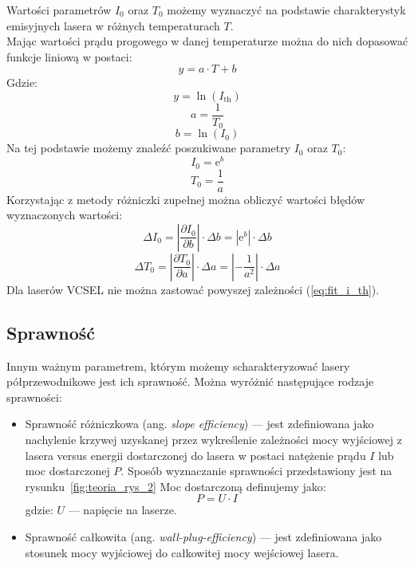 Wartości parametrów $I_0$ oraz $T_0$ możemy wyznaczyć na podstawie charakterystyk
emisyjnych lasera w różnych temperaturach $T$. \\
Mając wartości prądu progowego w danej temperaturze  można do nich dopasować funkcje liniową w postaci:
\begin{equation}
y = a \cdot T + b
\end{equation}
Gdzie:
\begin{equation}
y = \ln(I_{\mathrm{th}})
\end{equation}
\begin{equation}
a = \frac{1}{T_0}
\end{equation}
\begin{equation}
b = \ln(I_0)
\end{equation}
Na tej podstawie możemy znaleźć poszukiwane parametry $I_0$ oraz $T_0$:
\begin{equation}
I_0 = \mathrm{e}^b
\end{equation}
\begin{equation}
T_0 = \frac{1}{a}
\end{equation}
Korzystając z metody różniczki zupełnej można obliczyć wartości błędów wyznaczonych wartości:
\begin{equation}
\Delta I_0 = \left\lvert \frac{\partial I_{0}}{\partial b} \right\rvert \cdot \Delta b = | \mathrm{e}^b | \cdot \Delta b
\end{equation}
\begin{equation}
\Delta T_0 = \left\lvert \frac{\partial T_{0}}{\partial a} \right\rvert \cdot \Delta a = \left\lvert -\frac{1}{a^2} \right\rvert \cdot \Delta a
\end{equation}
Dla laserów VCSEL nie można zastować powyszej zależności (\ref{eq:fit_i_th}).
\subsection{Sprawność}
Innym ważnym parametrem, którym możemy scharakteryzować lasery półprzewodnikowe jest ich sprawność. Można wyróżnić następujące rodzaje sprawności:
\begin{itemize}
\item Sprawność różniczkowa (ang. \textit{slope efficiency}) --- jest zdefiniowana jako nachylenie krzywej uzyskanej przez wykreślenie zależności
mocy wyjściowej z lasera versus energii dostarczonej do lasera w postaci natężenie prądu $I$ lub moc dostarczonej $P$. Sposób wyznaczanie sprawności
przedstawiony jest na rysunku~\ref{fig:teoria_rys_2}
Moc dostarczoną definujemy jako:
\begin{equation}
P = U \cdot I
\end{equation}
gdzie: $U$ --- napięcie na laserze.
\item Sprawność całkowita (ang. \textit{wall-plug-efficiency}) --- jest zdefiniowana jako stosunek mocy wyjściowej do całkowitej mocy wejściowej lasera.
\end{itemize}
\newpage
